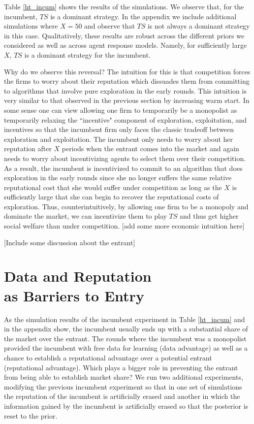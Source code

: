 \documentclass{article}
\theoremstyle{definition}
\begin{document}
Table \ref{ht_incum} shows the results of the simulations. We observe that, for the incumbent, $TS$ is a dominant strategy. In the appendix we include additional simulations where $X = 50$ and observe that $TS$ is not always a dominant strategy in this case. Qualitatively, these results are robust across the different priors we considered as well as across agent response models. Namely, for sufficiently large $X$, $TS$ is a dominant strategy for the incumbent.

Why do we observe this reversal? The intuition for this is that competition forces the firms to worry about their reputation which dissuades them from committing to algorithms that involve pure exploration in the early rounds. This intuition is very similar to that observed in the previous section by increasing warm start. In some sense one can view allowing one firm to temporarily be a monopolist as temporarily relaxing the ``incentive" component of exploration, exploitation, and incentives so that the incumbent firm only faces the classic tradeoff between exploration and exploitation. The incumbent only needs to worry about her reputation after $X$ periods when the entrant comes into the market and again needs to worry about incentivizing agents to select them over their competition. As a result, the incumbent is incentivized to commit to an algorithm that does exploration in the early rounds since she no longer suffers the same relative reputational cost that she would suffer under competition as long as the $X$ is sufficiently large that she can begin to recover the reputational costs of exploration. Thus, counterintuitively, by allowing one firm to be a monopoly and dominate the market, we can incentivize them to play $TS$ and thus get higher social welfare than under competition. [add some more economic intuition here]

[Include some discussion about the entrant]

\section{Data and Reputation \\ as Barriers to Entry}
\label{S:8}

As the simulation results of the incumbent experiment in Table \ref{ht_incum} and in the appendix show, the incumbent usually ends up with a substantial share of the market over the entrant. The rounds where the incumbent was a monopolist provided the incumbent with free data for learning (data advantage) as well as a chance to establish a reputational advantage over a potential entrant (reputational advantage). Which plays a bigger role in preventing the entrant from being able to establish market share? We run two additional experiments, modifying the previous incumbent experiment so that in one set of simulations the reputation of the incumbent is artificially erased and another in which the information gained by the incumbent is artificially erased so that the posterior is reset to the prior.
\end{document}
